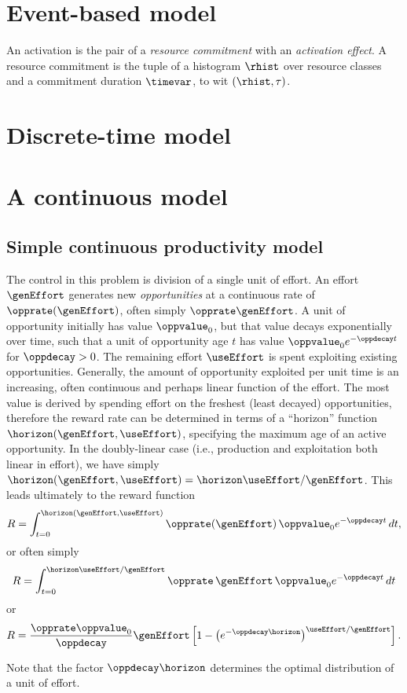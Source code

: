 \documentclass[10pt,a4paper]{article}
\begin{document}
\section{Event-based model}

An activation is the pair of a \emph{resource commitment} with an \emph{activation effect}.
A resource commitment is the tuple of a histogram $\rhist$ over resource classes and a commitment duration $\timevar$, to wit $(\rhist, \tau)$.


\section{Discrete-time model}

\section{A continuous model}

\subsection{Simple continuous productivity model}

\makecommand{\opprate}{\lambda}
\makecommand{\oppdecay}{\beta}

\makecommand{\horizon}{\tau}

The control in this problem is division of a single unit of effort.
An effort $\genEffort$ generates new \emph{opportunities} at a continuous rate of $\opprate(\genEffort)$,
often simply $\opprate\genEffort$.
A unit of opportunity initially has value $\oppvalue_0$, but
that value decays exponentially over time, such that
a unit of opportunity age $t$ has value $\oppvalue_0 e^{-\oppdecay t}$
for $\oppdecay > 0$.
%
The remaining effort $\useEffort$ is spent exploiting existing opportunities.
Generally, the amount of opportunity exploited per unit time is an increasing, often continuous and perhaps linear function of the effort.
The most value is derived by spending effort on the freshest (least decayed) opportunities,
therefore the reward rate can be determined in terms of a ``horizon'' function  $\horizon(\genEffort,\useEffort)$, specifying the maximum age of an active opportunity.
In the doubly-linear case (i.e., production and exploitation both linear in effort),
we have simply $\horizon(\genEffort,\useEffort) = \horizon \useEffort / \genEffort$.
This leads ultimately to the reward function
%
\begin{equation}
R = \int_{t=0}^{\horizon(\genEffort,\useEffort)}
	\opprate(\genEffort) \, \oppvalue_0 e^{-\oppdecay t} \, dt,
\end{equation}
%
or often simply
%
%
\begin{equation}
R = \int_{t=0}^{\horizon \useEffort / \genEffort}
	\opprate \, \genEffort \, \oppvalue_0 e^{-\oppdecay t} \, dt
\end{equation}
%
or
\begin{equation}
R = \frac{\opprate \oppvalue_0}{\oppdecay} \genEffort
\left[
	1 - \left( e^{-\oppdecay \horizon} \right)^{\useEffort / \genEffort }
\right].
\end{equation}

Note that the factor $\oppdecay \horizon$ determines the optimal distribution of a unit of effort.
\end{document}
